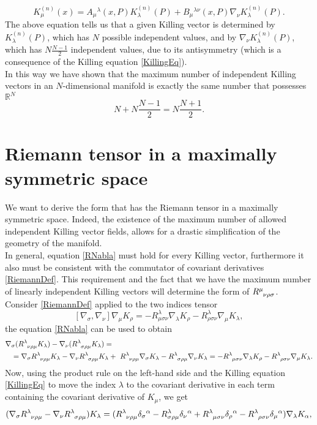 \begin{equation}\label{KillingExp}
    K_\mu^{(n)}(x)=A_\mu\phantom{}^\lambda(x,P)K_\lambda^{(n)}(P)+B_\mu\phantom{}^{\lambda\nu}(x,P)\nabla_\nu K_\lambda^{(n)}(P).
\end{equation}
The above equation tells us that a given Killing vector is determined by $K_\lambda^{(n)}(P)$, which has $N$ possible independent values, and by $\nabla_\nu K_\lambda^{(n)}(P)$, which has $N\frac{N-1}{2}$ independent values, due to its antisymmetry (which is a consequence of the Killing equation \eqref{KillingEq}).\\
In this way we have shown that the maximum number of independent Killing vectors in an $N$-dimensional manifold is exactly the same number that possesses $\mathbb{R}^N$ $$N+N\frac{N-1}{2}=N\frac{N+1}{2}.$$
\section{Riemann tensor in a maximally symmetric space}
We want to derive the form that has the Riemann tensor in a maximally symmetric space. Indeed, the existence of the maximum number of allowed independent Killing vector fields, allows for a  drastic simplification of the geometry of the manifold.\\
In general, equation \eqref{RNabla} must hold for every Killing vector, furthermore it also must be consistent with the commutator of covariant derivatives \eqref{RiemannDef}. This requirement and the fact that we have the maximum number of linearly independent Killing vectors will determine the form of $\tensor R{^\mu_{\nu\rho\sigma}}$. Consider \eqref{RiemannDef} applied to the two indices tensor $$ [\nabla_\sigma,\nabla_\nu]\nabla_\mu K_\rho=-R^\lambda_{\mu\sigma\nu}\nabla_\lambda K_\rho-R^\lambda _{\rho\sigma\nu}\nabla_\mu K_\lambda,$$ the equation \eqref{RNabla} can be used to obtain 
\begin{align*}
    \nabla&_\sigma(\tensor R{^\lambda_{\nu\rho\mu}}K_\lambda)-\nabla_\nu(\tensor R{^\lambda_{\sigma\rho\mu}}K_\lambda)=\\&=\nabla_\sigma \tensor R{^\lambda_{\nu\rho\mu}}K_\lambda-\nabla_\nu \tensor R{^\lambda_{\sigma\rho\mu}}K_\lambda+\ \tensor R{^\lambda_{\nu\rho\mu}}\nabla_\sigma K_\lambda- \tensor R{^\lambda_{\sigma\rho\mu}}\nabla_\nu K_\lambda=-\tensor R{^\lambda_{\mu\sigma\nu}}\nabla_\lambda K_\rho-\tensor R{^\lambda _{\rho\sigma\nu}}\nabla_\mu K_\lambda.
\end{align*}
Now, using the product rule on the left-hand side and the Killing equation \eqref{KillingEq} to move the index $\lambda$ to the covariant derivative in each term containing the covariant derivative of $K_\mu$, we get $$ (\nabla_\sigma \tensor R{^\lambda_{\nu\rho\mu}}-\nabla_\nu \tensor R{^\lambda_{\sigma\rho\mu}})K_\lambda=(\tensor R{^\lambda_{\nu\rho\mu}}\delta_{\sigma}\phantom{}^\alpha-R^\lambda_{\sigma\rho\mu}\delta_{\nu}\phantom{}^\alpha+\tensor R{^\lambda_{\mu\sigma\nu}}\delta_{\rho}\phantom{}^\alpha-\tensor R{^\lambda_{\rho\sigma\nu}}\delta_{\mu}\phantom{}^\alpha)\nabla_\lambda K_\alpha,$$
